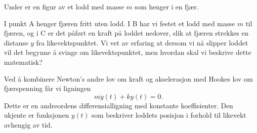 \documentclass{article}
\theoremstyle{definition}
\newenvironment{ex}
{\pushQED{\qed}\renewcommand{\qedsymbol}{$\triangle$}\exx}
{\popQED\endexx}
\theoremstyle{remark}
\newcommand{\springfig}[6]{%
\begin{scope}[xshift=#6,
              spring/.style = {decorate,
                              decoration = {aspect         = 0.5, 
                                            segment length = #1,
                                            amplitude      = 2mm,
                                            coil}}]

\path (0,0)                            coordinate (g) 
      (0,-0.5cm)                       coordinate (topspring) 
      (0, #2)                          coordinate (bottomspring) 
      (bottomspring) ++(0,-.3cm)       coordinate (pt2)
                      +(0cm,-#3)       coordinate (pt3)
                      +(1.25cm,-#3)    coordinate (#5 pt3);

  \node [platform,
        anchor = south] at (g)  {};
  \draw [very thick]    (-0.5,0)         -- (0.5,0);
  \draw                (topspring)     -- (g)
                      (bottomspring)  -- (pt2.north);
  \draw [spring]       (bottomspring)  -- (topspring);
  \draw [fill=black] (pt3) circle (#3) 
                          node[inner sep = 0,
                                scale     = #4,
                                text      = white]{$m$};
  \node[below=1.5*#3] at (pt3) {#5};
  \end{scope}
}
\begin{document}
\begin{multicols*}{2}
\begin{ex} \label{ex:fjær}
  Under er en figur av et lodd med masse $m$ som henger i en fjær.
  \begin{center}
  \end{center}
  I punkt A henger fjæren fritt uten lodd. I B har vi festet et lodd med masse $m$ til fjæren, og i C er det påført en kraft på loddet nedover, slik at fjæren strekkes en distanse $y$ fra likevektspunktet. Vi vet av erfaring at dersom vi nå slipper loddet vil det begynne å svinge om likevektspunktet, men hvordan skal vi beskrive dette matematisk?
  
  Ved å kombinere Newton's andre lov om kraft og akselerasjon med Hookes lov om fjærspenning får vi ligningen
  \begin{equation*}
    m \ddot{y}(t) + k y(t) = 0.
  \end{equation*}
  Dette er en andreordens differensialligning med konstante koeffisienter. Den ukjente er funksjonen $y(t)$ som beskriver loddets posisjon i forhold til likevekt avhengig av tid.
\end{ex}


\end{multicols*}
\end{document}
